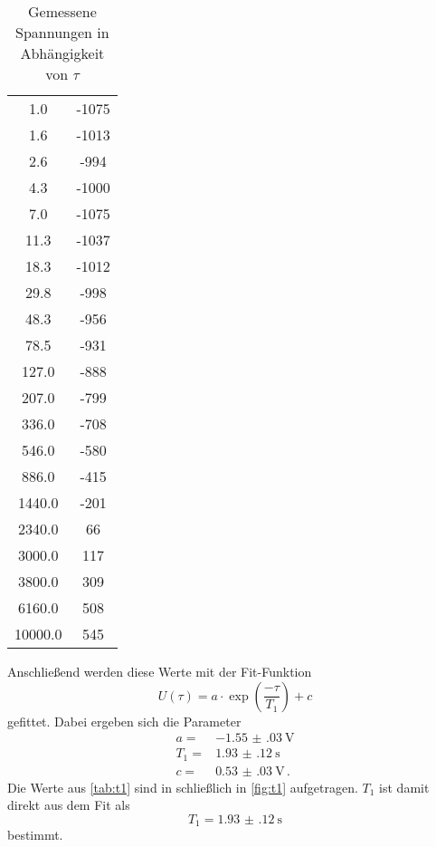 \begin{table}
    \centering
    \caption{Gemessene Spannungen in Abhängigkeit von $\tau$}
    \label{tab:t1}
    \begin{tabular}{S[table-format=5.1] S[table-format=4.0]}
        \toprule
        \tableSI{\tau}{\milli\second} &   \\
         &  -1075  \\
        1.6 & -1013 \\
        2.6 & -994 \\
        4.3 & -1000 \\
        7.0 & -1075 \\
        11.3 & -1037 \\
        18.3 & -1012 \\
        29.8 & -998 \\
        48.3 & -956 \\
        78.5 & -931 \\
        127.0 & -888 \\
        207.0 & -799 \\
        336.0 & -708 \\
        546.0 & -580 \\
        886.0 & -415 \\
        1440.0 & -201 \\
        2340.0 & 66 \\
        3000.0 & 117 \\
        3800.0 & 309 \\
        6160.0 & 508 \\
        10000.0 & 545 \\
        \bottomrule
    \end{tabular}
\end{table}

Anschließend werden diese Werte mit der Fit-Funktion 
\begin{equation}
    U(\tau) = a \cdot \exp(\frac{- \tau}{T_1}) + c 
    \label{eq:fit_t1}
\end{equation}
gefittet.
Dabei ergeben sich die Parameter 
\begin{align*}
    a =& \SI{-1.55(03)}{\volt} \\
    T_1 =& \SI{1.93(12)}{\second} \\
    c =& \SI{0.53(03)}{\volt} \, .
\end{align*}
Die Werte aus \autoref{tab:t1} sind in schließlich in \autoref{fig:t1} aufgetragen.
$T_1$ ist damit direkt aus dem Fit als 
\begin{equation}
    T_1 = \SI{1.93(12)}{\second} 
    \label{eq:t1_wert}
\end{equation}
bestimmt.

